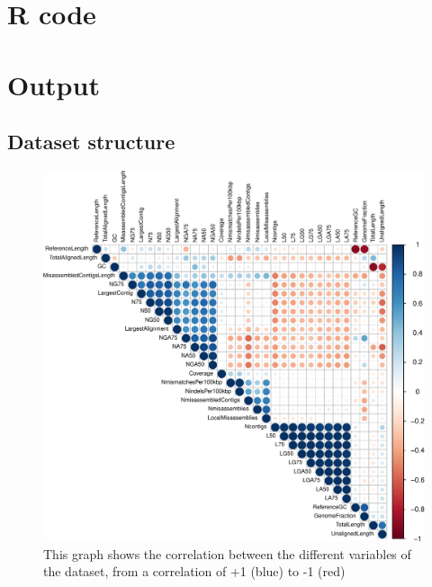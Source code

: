 \documentclass[11pt, a4paper,titlepage]{article}
\begin{document}
\section{R code}

\section{Output}
\subsection{Dataset structure}

\begin{figure}
  \centering
  \includegraphics[scale=0.75]{corrplot-crop.pdf}
  \caption{This graph shows the correlation between the different
    variables of the dataset, from a correlation of +1 (blue) to -1
    (red)}
  \label{fig:corrplot}
\end{figure}

 

\end{document}
